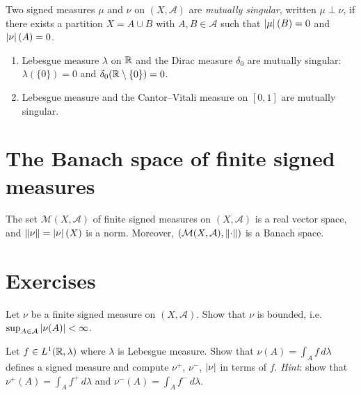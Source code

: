 \begin{definition}
Two signed measures $\mu$ and $\nu$ on $(X, \mathcal{A})$ are \emph{mutually
singular}, written $\mu \perp \nu$, if there exists a partition $X = A \cup B$
with $A, B \in \mathcal{A}$ such that $\left| \mu \right|(B) = 0$ and $\left| \nu \right|(A) = 0$.
\end{definition}

\begin{example}
\begin{enumerate}
    \item Lebesgue measure $\lambda$ on $\mathbb{R}$ and the Dirac measure $\delta_0$ are
    mutually singular: $\lambda(\{0\}) = 0$ and $\delta_0(\mathbb{R} \setminus \{0\}) = 0$.
    \item Lebesgue measure and the Cantor--Vitali measure on $[0,1]$ are mutually
    singular.
\end{enumerate}
\end{example}

\section{The Banach space of finite signed measures}

\begin{proposition}
The set $\mathcal{M}(X, \mathcal{A})$ of finite signed measures on
$(X, \mathcal{A})$ is a real vector space, and $\left\| \nu \right\| = \left| \nu \right|(X)$ is a
norm. Moreover, $(\mathcal{M}(X, \mathcal{A}), \left\| \cdot \right\|)$ is a Banach space.
\end{proposition}

\section{Exercises}

\begin{exercise}
Let $\nu$ be a finite signed measure on $(X, \mathcal{A})$. Show that $\nu$ is
bounded, i.e.\ $\sup_{A \in \mathcal{A}} \left| \nu(A) \right| < \infty$.
\end{exercise}

\begin{exercise}
Let $f \in L^1(\mathbb{R}, \lambda)$ where $\lambda$ is Lebesgue measure. Show that
$\nu(A) = \int_A f\, d\lambda$ defines a signed measure and compute $\nu^+$,
$\nu^-$, $\left| \nu \right|$ in terms of $f$.
\emph{Hint}: show that $\nu^+(A) = \int_A f^+\, d\lambda$ and
$\nu^-(A) = \int_A f^-\, d\lambda$.
\end{exercise}

